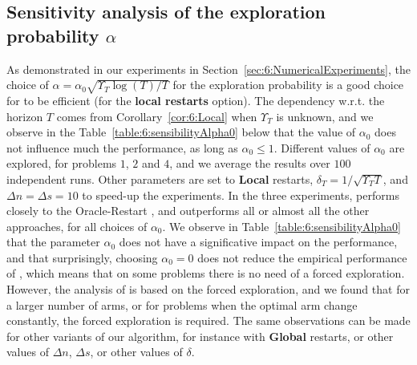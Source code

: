 \subsection{Sensitivity analysis of the exploration probability $\alpha$}\label{sec:6:choosingAlpha0}

As demonstrated in our experiments in Section~\ref{sec:6:NumericalExperiments},
the choice of $\alpha=\alpha_0\sqrt{\Upsilon_T\log(T)/T}$ for the exploration probability is a good choice for \GLRklUCB{} to be efficient (for the \textbf{local restarts} option).
The dependency w.r.t. the horizon $T$ comes from Corollary~\ref{cor:6:Local} when $\Upsilon_T$ is unknown, and we observe in the Table~\ref{table:6:sensibilityAlpha0} below that the value of $\alpha_0$ does not influence much the performance, as long as $\alpha_0\leq1$.
Different values of $\alpha_0$ are explored, for problems $1$, $2$ and $4$, and we average the results over $100$ independent runs.
Other parameters are set to \textbf{Local} restarts, $\delta_T=1/\sqrt{\Upsilon_T T}$, and $\Delta n = \Delta s = 10$ to speed-up the experiments.
%
In the three experiments, \GLRklUCB{} performs closely to the Oracle-Restart \klUCB{}, and outperforms all or almost all the other approaches, for all choices of $\alpha_0$.
We observe in Table~\ref{table:6:sensibilityAlpha0} that the parameter $\alpha_0$ does not have a significative impact on the performance,
and that surprisingly, choosing $\alpha_0 = 0$ does not reduce the empirical performance of \GLRklUCB, which means that on some problems there is no need of a forced exploration.
However, the analysis of \GLRklUCB{} is based on the forced exploration, and we found that for a larger number of arms, or for problems when the optimal arm change constantly, the forced exploration is required.
%
The same observations can be made for other variants of our algorithm, for instance with \textbf{Global} restarts, or other values of $\Delta n$, $\Delta s$, or other values of $\delta$.

